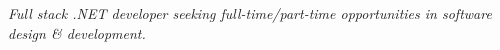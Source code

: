 




\begin{cvparagraph}

\RaggedRight \centering
\textit{Full stack .NET developer seeking full-time/part-time opportunities in software design \& development.}

\end{cvparagraph}


